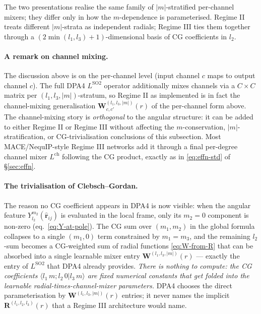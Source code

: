 \documentclass[11pt,a4paper]{article}
\newcommand{\brh}{\hat{\bm{r}}}
\theoremstyle{plain}
\theoremstyle{definition}
\theoremstyle{remark}
\begin{document}
    \medskip
    The two presentations realise the same family of $|m|$-stratified per-channel mixers; they differ only in how the $m$-dependence is parameterised.
    Regime II treats different $|m|$-strata as independent radials; Regime III ties them together through a $(2\min(l_1,l_3)+1)$-dimensional basis of CG coefficients in $l_2$.

    \paragraph{A remark on channel mixing.}
    The discussion above is on the per-channel level (input channel $c$ maps to
    output channel $c$). The full DPA4 $L^{\mathrm{SO2}}$ operator additionally
    mixes channels via a $C\times C$ matrix per $(l_1,l_3,|m|)$-stratum, so Regime
    II as implemented is in fact the channel-mixing generalisation
$\bm{W}^{(l_1,l_3,|m|)}_{c,c'}(r)$ of the per-channel form above. The
    channel-mixing story is \emph{orthogonal} to the angular structure: it can be
    added to either Regime II or Regime III without affecting the $m$-conservation,
$|m|$-stratification, or CG-trivialisation conclusions of this subsection. Most
    MACE/NequIP-style Regime III networks add it through a final per-degree channel
    mixer $L^{\mathrm{ch}}$ following the CG product, exactly as in
    \eqref{eq:effn-std} of \S\ref{sec:effn}.

    \paragraph{The trivialisation of Clebsch--Gordan.}
    The reason no CG coefficient appears in DPA4 is now visible: when the angular
    feature $Y_{l_2}^{m_2}(\brh_{ij})$ is evaluated in the local frame, only its
$m_2=0$ component is non-zero (eq.~\eqref{eq:Y-at-pole}). The CG sum over
$(m_1,m_2)$ in the global formula collapses to a single $(m_1,0)$ term
    constrained by $m_1=m_3$, and the remaining $l_2$-sum becomes a CG-weighted sum
    of radial functions \eqref{eq:W-from-R} that can be absorbed into a single
    learnable mixer entry $\bm{W}^{(l_1,l_3,|m|)}(r)$ — exactly the entry of
$L^{\mathrm{SO2}}$ that DPA4 already provides. \emph{There is nothing to
    compute: the CG coefficients $\langle l_1\,m;l_2\,0|l_3\,m\rangle$ are fixed
    numerical constants that get folded into the learnable
    radial-times-channel-mixer parameters.} DPA4 chooses the direct
    parameterisation by $\bm{W}^{(l_1,l_3,|m|)}(r)$ entries; it never names the
    implicit $\bm{R}^{(l_1,l_2,l_3)}(r)$ that a Regime III architecture would name.
\end{document}
